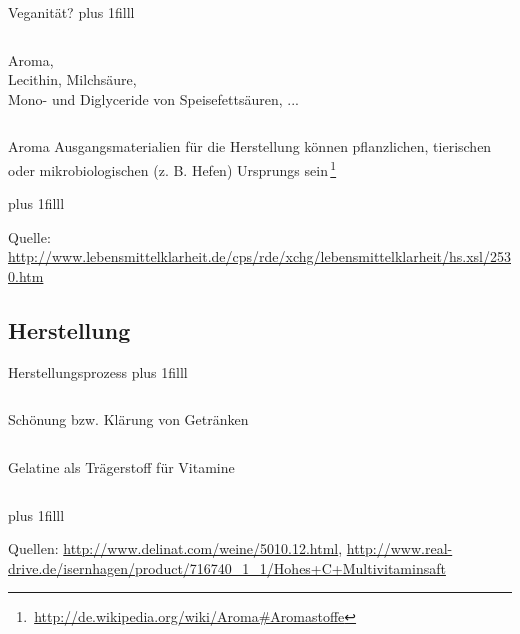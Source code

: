 \documentclass{beamer}
\begin{document}
\begin{frame}{Veganität?}
	\vskip0pt plus 1filll

	\begin{columns}
			\begin{center}
			Aroma,\\
			Lecithin,
			Milchsäure,\\
			Mono- und Diglyceride von
			Speisefettsäuren, ...
	\end{center}
			\begin{center}
			\end{center}
	\end{columns}

	\begin{block}{Aroma}
		Ausgangsmaterialien für die Herstellung können pflanzlichen,
		tierischen oder mikrobiologischen (z. B. Hefen) Ursprungs
		sein\,\footnote{\,\url{http://de.wikipedia.org/wiki/Aroma\#Aromastoffe}}
	\end{block}

	\vskip0pt plus 1filll
	\par\hrulefill\par
	\tiny{Quelle:
	\url{http://www.lebensmittelklarheit.de/cps/rde/xchg/lebensmittelklarheit/hs.xsl/2530.htm}}
\end{frame}

\subsection*{Herstellung}
\begin{frame}{Herstellungsprozess}
	\vskip0pt plus 1filll
	\begin{columns}[c]
		\column{0.4\textwidth}
			\centering
		\column{0.6\textwidth}
			Schönung bzw. Klärung von Getränken
	\end{columns}
	\begin{columns}[c]
		\column{0.6\textwidth}
			Gelatine als Trägerstoff für Vitamine
			\centering
	\end{columns}
	\vskip0pt plus 1filll
	\par\hrulefill\par
	\tiny{Quellen:
			\url{http://www.delinat.com/weine/5010.12.html}, 
	\url{http://www.real-drive.de/isernhagen/product/716740_1_1/Hohes+C+Multivitaminsaft}}
\end{frame}
\end{document}
